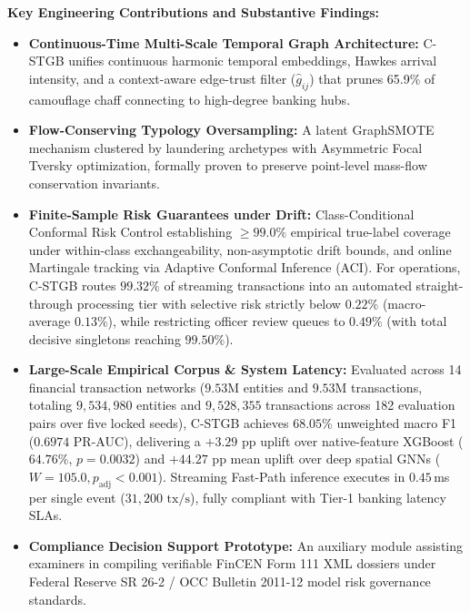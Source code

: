 \documentclass[11pt,a4paper]{article}
\begin{document}
\vspace{0.6em}
\noindent
\textbf{Key Engineering Contributions and Substantive Findings:}
\begin{itemize}[leftmargin=*,itemsep=2pt,topsep=2pt]
    \item \textbf{Continuous-Time Multi-Scale Temporal Graph Architecture:} C-STGB unifies continuous harmonic temporal embeddings, Hawkes arrival intensity, and a context-aware edge-trust filter ($\hat{g}_{ij}$) that prunes 65.9\% of camouflage chaff connecting to high-degree banking hubs.
    \item \textbf{Flow-Conserving Typology Oversampling:} A latent GraphSMOTE mechanism clustered by laundering archetypes with Asymmetric Focal Tversky optimization, formally proven to preserve point-level mass-flow conservation invariants.
    \item \textbf{Finite-Sample Risk Guarantees under Drift:} Class-Conditional Conformal Risk Control establishing $\ge 99.0\%$ empirical true-label coverage under within-class exchangeability, non-asymptotic drift bounds, and online Martingale tracking via Adaptive Conformal Inference (ACI). For operations, C-STGB routes $99.32\%$ of streaming transactions into an automated straight-through processing tier with selective risk strictly below $0.22\%$ (macro-average $0.13\%$), while restricting officer review queues to $0.49\%$ (with total decisive singletons reaching $99.50\%$).
    \item \textbf{Large-Scale Empirical Corpus \& System Latency:} Evaluated across 14 financial transaction networks ($9.53\text{M}$ entities and $9.53\text{M}$ transactions, totaling $9,534,980$ entities and $9,528,355$ transactions across 182 evaluation pairs over five locked seeds), C-STGB achieves $68.05\%$ unweighted macro F1 ($0.6974$ PR-AUC), delivering a $+3.29\text{ pp}$ uplift over native-feature XGBoost ($64.76\%$, $p=0.0032$) and $+44.27\text{ pp}$ mean uplift over deep spatial GNNs ($W=105.0, p_{\text{adj}} < 0.001$). Streaming Fast-Path inference executes in $0.45$\,ms per single event ($31,200\text{ tx/s}$), fully compliant with Tier-1 banking latency SLAs.
    \item \textbf{Compliance Decision Support Prototype:} An auxiliary module assisting examiners in compiling verifiable FinCEN Form 111 XML dossiers under Federal Reserve SR 26-2 / OCC Bulletin 2011-12 model risk governance standards.
\end{itemize}
\end{document}
